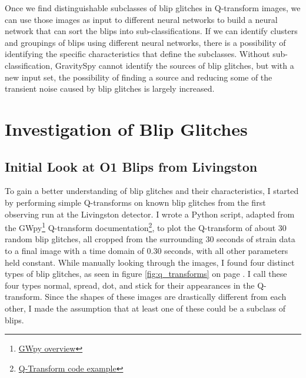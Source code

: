 \documentclass[a4paper]{article}
\begin{document}
Once we find distinguishable subclasses of blip glitches in Q-transform images, we can use those images as input to different neural networks to build a neural network that can sort the blips into sub-classifications. If we can identify clusters and groupings of blips using different neural networks, there is a possibility of identifying the specific characteristics that define the subclasses. Without sub-classification, GravitySpy cannot identify the sources of blip glitches, but with a new input set, the possibility of finding a source and reducing some of the transient noise caused by blip glitches is largely increased. 

\section{Investigation of Blip Glitches}

\subsection{Initial Look at O1 Blips from Livingston} \label{investigation}

To gain a better understanding of blip glitches and their characteristics, I started by performing simple Q-transforms on known blip glitches from the first observing run at the Livingston detector. I wrote a Python script, adapted from the GWpy\footnote{\href{https://gwpy.github.io/docs/stable/overview.html}{GWpy overview}} Q-transform documentation\footnote{\href{https://gwpy.github.io/docs/stable/examples/timeseries/qscan.html}{Q-Transform code example}}, to plot the Q-transform of about 30 random blip glitches, all cropped from the surrounding 30 seconds of strain data to a final image with a time domain of 0.30 seconds, with all other parameters held constant. While manually looking through the images, I found four distinct types of blip glitches, as seen in figure \ref{fig:q_transforms} on page \pageref{fig:q_transforms}. I call these four types normal, spread, dot, and stick for their appearances in the Q-transform. Since the shapes of these images are drastically different from each other, I made the assumption that at least one of these could be a subclass of blips.
\end{document}
